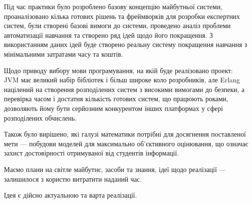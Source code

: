 
Під час практики було розроблено базову концепцію майбутньої системи,
проаналізовано кілька готових рішень та фреймворків для розробки експертних
систем, були створені базові вимоги до системи,
проведено аналіз проблеми автоматизації навчання та створено ряд ідей щодо
його покращення.
З використанням даних ідей буде створено реальну систему покращення навчання з
мінімальними затратами часу та коштів.

Щодо приводу вибору мови програмування, на якій буде реалізовано проект: JVM має
великий набір бібліотек і більш широке коло розробників, але Erlang націлений
на створення розподілених систем з високими вимогами до безпеки, а перевірка
часом і достатня кількість готових систем, що працюють роками, дозволяють
йому бути серйозним конкурентом інших платформах у сфері розподілених
обчислень.

Також було вирішено, які галузі математики потрібні для досягнення поставленої
мети --- побудови моделей для максимально об’єктивного оцінювання, що означає
захист достовірності отримуваної від студентів інформації.

Маємо плани на світле майбутнє, засоби та знання, ідеї щодо реалізації ---
залишилося з користю витратити наданий час.

Ідея є дійсно актуальною та варта реалізації.
